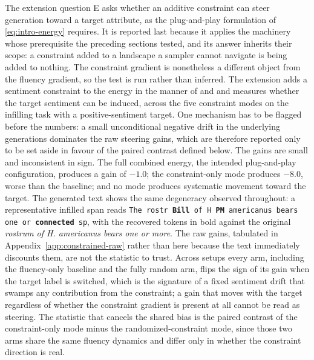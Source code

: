 The extension question E asks whether an additive constraint can steer generation toward a target attribute, as the plug-and-play formulation of \eqref{eq:intro-energy} requires. It is reported last because it applies the machinery whose prerequisite the preceding sections tested, and its answer inherits their scope: a constraint added to a landscape a sampler cannot navigate is being added to nothing. The constraint gradient is nonetheless a different object from the fluency gradient, so the test is run rather than inferred. The extension adds a sentiment constraint to the energy in the manner of \citet{kumar2022gradient} and \citet{qin2022cold} and measures whether the target sentiment can be induced, across the five constraint modes on the infilling task with a positive-sentiment target.
One mechanism has to be flagged before the numbers: a small unconditional negative drift in the underlying generations dominates the raw steering gains, which are therefore reported only to be set aside in favour of the paired contrast defined below. The gains are small and inconsistent in sign. The full combined energy, the intended plug-and-play configuration, produces a gain of $-1.0$; the constraint-only mode produces $-8.0$, worse than the baseline; and no mode produces systematic movement toward the target. The generated text shows the same degeneracy observed throughout: a representative infilled span reads \texttt{The rostr \textbf{Bill} of H \textbf{PM} americanus bears one or \textbf{connected} sp}, with the recovered tokens in bold against the original \emph{rostrum of H. americanus bears one or more}.
The raw gains, tabulated in Appendix~\ref{app:constrained-raw} rather than here because the text immediately discounts them, are not the statistic to trust. Across setups every arm, including the fluency-only baseline and the fully random arm, flips the sign of its gain when the target label is switched, which is the signature of a fixed sentiment drift that swamps any contribution from the constraint; a gain that moves with the target regardless of whether the constraint gradient is present at all cannot be read as steering. The statistic that cancels the shared bias is the paired contrast of the constraint-only mode minus the randomized-constraint mode, since those two arms share the same fluency dynamics and differ only in whether the constraint direction is real.

